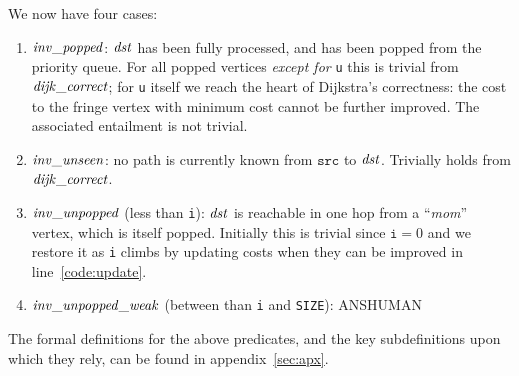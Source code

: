 We now have four cases:
\begin{enumerate}
\item $\mathit{inv\_popped}$: $\mathit{dst}$ has been fully processed, and has been
popped from the priority queue.  For all popped vertices \emph{except for} \texttt{u}
this is trivial from $\mathit{dijk\_correct}$; for \texttt{u} itself we reach the heart of Dijkstra's correctness: the cost to the fringe vertex with minimum cost cannot be further improved.  The associated entailment is not trivial.
\item $\mathit{inv\_unseen}$: no path is currently known from $\texttt{src}$ to $\mathit{dst}$.  Trivially holds from $\mathit{dijk\_correct}$.
\item $\mathit{inv\_unpopped}$ (less than \texttt{i}): $\mathit{dst}$ is reachable in
one hop from a ``\emph{mom}'' vertex, which is itself popped.  Initially this is trivial since $\texttt{i}=0$ and we restore it as \texttt{i} climbs by updating costs when they can be improved in line~\ref{code:update}.
\item $\mathit{inv\_unpopped\_weak}$ (between than \texttt{i} and \texttt{SIZE}): ANSHUMAN
\end{enumerate}
The formal definitions for the above predicates, and the key subdefinitions upon which they rely, can be found in appendix~\ref{sec:apx}.

